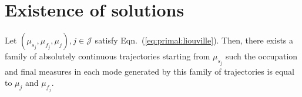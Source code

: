 \section{Existence of solutions}
  \begin{lemma}
Let $(\mu_{s_j},\mu_{f_j},\mu_j), j\in \mathcal J$ satisfy Eqn.~(\ref{eq:primal:liouville}). Then, there exists a family of absolutely continuous trajectories starting from $\mu_{s_j}$ such the occupation and final measures in each mode generated by this family of trajectories is equal to $\mu_j$ and $\mu_{f_j}$.
    \label{lemma:existence}
  \end{lemma}
%
